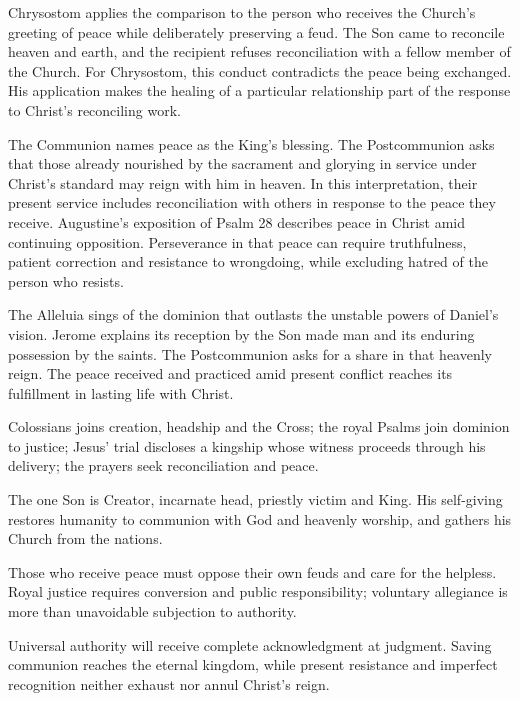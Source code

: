 Chrysostom applies the comparison to the person who receives the Church's greeting of peace while deliberately preserving a feud. The Son came to reconcile heaven and earth, and the recipient refuses reconciliation with a fellow member of the Church. For Chrysostom, this conduct contradicts the peace being exchanged. His application makes the healing of a particular relationship part of the response to Christ's reconciling work.

The Communion names peace as the King's blessing. The Postcommunion asks that those already nourished by the sacrament and glorying in service under Christ's standard may reign with him in heaven. In this interpretation, their present service includes reconciliation with others in response to the peace they receive. Augustine's exposition of Psalm 28 describes peace in Christ amid continuing opposition. Perseverance in that peace can require truthfulness, patient correction and resistance to wrongdoing, while excluding hatred of the person who resists.

The Alleluia sings of the dominion that outlasts the unstable powers of Daniel's vision. Jerome explains its reception by the Son made man and its enduring possession by the saints. The Postcommunion asks for a share in that heavenly reign. The peace received and practiced amid present conflict reaches its fulfillment in lasting life with Christ.

\begin{fourSenses}
\item[Literal.] Colossians joins creation, headship and the Cross; the royal Psalms join dominion to justice; Jesus' trial discloses a kingship whose witness proceeds through his delivery; the prayers seek reconciliation and peace.
\item[Allegorical.] The one Son is Creator, incarnate head, priestly victim and King. His self-giving restores humanity to communion with God and heavenly worship, and gathers his Church from the nations.
\item[Moral.] Those who receive peace must oppose their own feuds and care for the helpless. Royal justice requires conversion and public responsibility; voluntary allegiance is more than unavoidable subjection to authority.
\item[Anagogical.] Universal authority will receive complete acknowledgment at judgment. Saving communion reaches the eternal kingdom, while present resistance and imperfect recognition neither exhaust nor annul Christ's reign.
\end{fourSenses}
